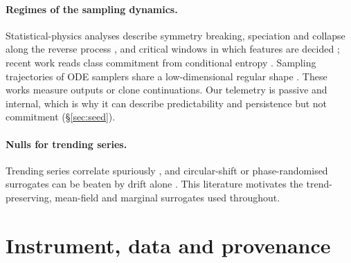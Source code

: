 \documentclass[11pt]{article}
\begin{document}
\paragraph{Regimes of the sampling dynamics.} Statistical-physics analyses describe symmetry breaking, speciation and collapse along the reverse process \citep{raya2023spontaneous,biroli2023generative,biroli2024dynamical,sclocchi2025phase}, and critical windows in which features are decided \citep{li2024critical}; recent work reads class commitment from conditional entropy \citep{handke2026entropic}. Sampling trajectories of ODE samplers share a low-dimensional regular shape \citep{chen2024trajectory}. These works measure outputs or clone continuations. Our telemetry is passive and internal, which is why it can describe predictability and persistence but not commitment (\S\ref{sec:seed}).

\paragraph{Nulls for trending series.} Trending series correlate spuriously \citep{yule1926why,granger1974spurious}, and circular-shift or phase-randomised surrogates can be beaten by drift alone \citep{theiler1992testing,schreiber2000surrogate,harris2020nonsense}. This literature motivates the trend-preserving, mean-field and marginal surrogates used throughout.

\section{Instrument, data and provenance}\label{sec:instrument}
\end{document}
